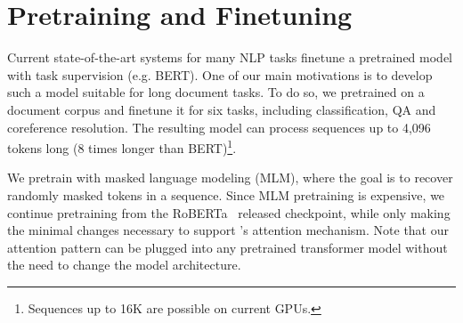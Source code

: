 
\section{Pretraining and Finetuning}
\label{sec:pretrain}

Current state-of-the-art systems for many NLP tasks finetune a pretrained model with task supervision (e.g. BERT).
One of our main motivations is to develop such a model suitable for long document tasks.
To do so, we pretrained \model on a document corpus and finetune it for six tasks, including classification, QA and coreference resolution.
The resulting model can process sequences up to 4,096 tokens long (8 times longer than BERT)\footnote{Sequences up to 16K are possible on current GPUs.}.





We pretrain \model with masked language modeling (MLM), where the goal is to recover randomly masked tokens in a sequence. 
Since MLM pretraining is expensive, we continue pretraining from the RoBERTa~\cite{roberta} released checkpoint, while only making the minimal changes necessary to support \model's attention mechanism.
Note that our attention pattern can be plugged into any pretrained transformer model without the need to change the model architecture. 

